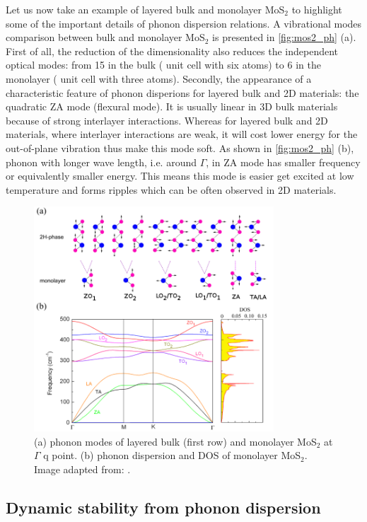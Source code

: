 Let us now take an example of layered bulk and monolayer MoS$_2$ to highlight some of the important details of phonon dispersion relations. A vibrational modes comparison between bulk and monolayer MoS$_2$ is presented in \autoref{fig:mos2_ph} (a). First of all, the reduction of the dimensionality also reduces the independent optical modes: from 15 in the bulk ( unit cell with six atoms) to 6 in the monolayer ( unit cell with three atoms). Secondly, the appearance of a characteristic feature of phonon disperions for layered bulk and 2D materials: the quadratic ZA mode (flexural mode). It is usually linear in 3D bulk materials because of strong interlayer interactions. Whereas for layered bulk and 2D materials, where interlayer interactions are weak, it will cost lower energy for the out-of-plane vibration thus make this mode soft. As shown in \autoref{fig:mos2_ph} (b), phonon with longer wave length, i.e. around $\Gamma$, in ZA mode has smaller frequency or equivalently smaller energy. This means this mode is easier get excited at low temperature and forms ripples which can be often observed in 2D materials. 

\begin{figure}[htbp!] 
\centering  
\includegraphics[width=0.8\textwidth]{mos2_ph.png}
\caption{(a) phonon modes of layered bulk (first row) and monolayer MoS$_2$ at $\Gamma$ q point. (b) phonon dispersion and DOS of monolayer MoS$_2$. Image adapted from: \cite{Cai2014a}. }  
\label{fig:mos2_ph}
\end{figure} 


\subsection{Dynamic stability from phonon dispersion}

